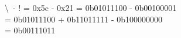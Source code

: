 \documentclass{article}
\begin{document}
\noindent \textbackslash\ - ! = 0x5c - 0x21 = 0b01011100 - 0b00100001\\
= 0b01011100 + 0b11011111 - 0b100000000\\
= 0b00111011
\end{document}
